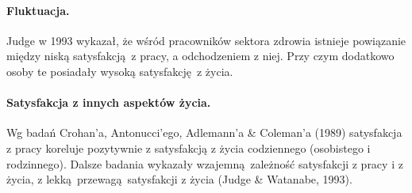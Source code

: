 \paragraph{Fluktuacja.} Judge w 1993 wykazał, że wśród pracowników sektora zdrowia istnieje powiązanie między niską satysfakcją z pracy, a odchodzeniem z niej. Przy czym dodatkowo osoby te posiadały wysoką satysfakcję z życia.
\paragraph{Satysfakcja z innych aspektów życia.} Wg badań Crohan'a, Antonucci'ego, Adlemann'a \& Coleman'a (1989) satysfakcja z pracy koreluje pozytywnie z satysfakcją z życia codziennego (osobistego i rodzinnego). Dalsze badania wykazały wzajemną zależność satysfakcji z pracy i z życia, z lekką przewagą satysfakcji z życia (Judge \& Watanabe, 1993).
